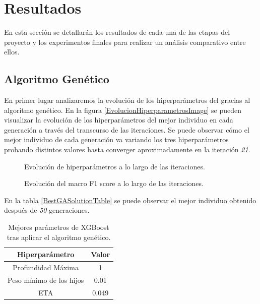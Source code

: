 
\chapter{Resultados}
\label{resultados}

  En esta sección se detallarán los resultados de cada una de las etapas del proyecto y los experimentos finales para realizar un análisis comparativo entre ellos.

\section{Algoritmo Genético}

  En primer lugar analizaremos la evolución de los hiperparámetros del  gracias al algoritmo genético. En la figura \eqref{EvolucionHiperparametrosImage} se pueden visualizar la evolución de los hiperparámetros del mejor individuo en cada generación a través del transcurso de las iteraciones. Se puede observar cómo el mejor individuo de cada generación va variando los tres hiperparámetros probando distintos valores hasta converger aproximadamente en la iteración \textit{21}.

  \begin{figure}[H]
      \centering
      
      \caption{Evolución de hiperparámetros a lo largo de las iteraciones.}
      \label{EvolucionHiperparametrosImage}
   \end{figure}

  \begin{figure}
      \centering
      
      \caption{Evolución del macro F1 score a lo largo de las iteraciones.}
      \label{EvolucionF1ScoreImage}
   \end{figure}

  En la tabla \eqref{BestGASolutionTable} se puede observar el mejor individuo obtenido después de \textit{50} generaciones.

  \begin{table}[H]
      \centering
          \begin{tabular}{ |c|c| } 
              \hline
              \textbf{Hiperparámetro} & \textbf{Valor}\\
              \hline
                  Profundidad Máxima & 1 \\
                  Peso mínimo de los hijos & 0.01 \\ 
                  ETA & 0.049 \\ 
              \hline

          \end{tabular}
      \caption{Mejores parámetros de XGBoost tras aplicar el algoritmo genético.}
      \label{BestGASolutionTable}
  \end{table}

